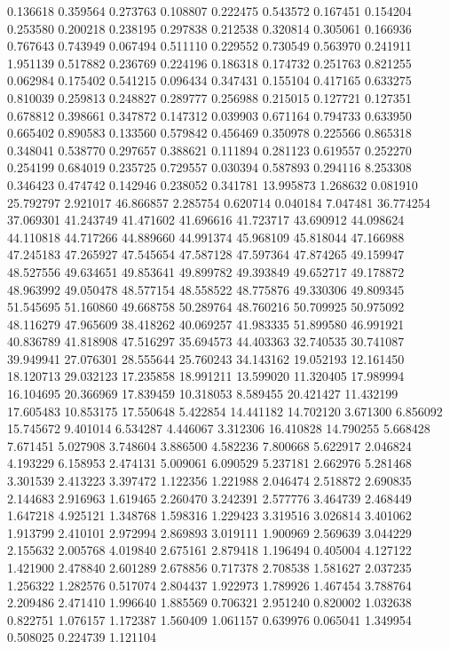 0.136618
0.359564
0.273763
0.108807
0.222475
0.543572
0.167451
0.154204
0.253580
0.200218
0.238195
0.297838
0.212538
0.320814
0.305061
0.166936
0.767643
0.743949
0.067494
0.511110
0.229552
0.730549
0.563970
0.241911
1.951139
0.517882
0.236769
0.224196
0.186318
0.174732
0.251763
0.821255
0.062984
0.175402
0.541215
0.096434
0.347431
0.155104
0.417165
0.633275
0.810039
0.259813
0.248827
0.289777
0.256988
0.215015
0.127721
0.127351
0.678812
0.398661
0.347872
0.147312
0.039903
0.671164
0.794733
0.633950
0.665402
0.890583
0.133560
0.579842
0.456469
0.350978
0.225566
0.865318
0.348041
0.538770
0.297657
0.388621
0.111894
0.281123
0.619557
0.252270
0.254199
0.684019
0.235725
0.729557
0.030394
0.587893
0.294116
8.253308
0.346423
0.474742
0.142946
0.238052
0.341781
13.995873
1.268632
0.081910
25.792797
2.921017
46.866857
2.285754
0.620714
0.040184
7.047481
36.774254
37.069301
41.243749
41.471602
41.696616
41.723717
43.690912
44.098624
44.110818
44.717266
44.889660
44.991374
45.968109
45.818044
47.166988
47.245183
47.265927
47.545654
47.587128
47.597364
47.874265
49.159947
48.527556
49.634651
49.853641
49.899782
49.393849
49.652717
49.178872
48.963992
49.050478
48.577154
48.558522
48.775876
49.330306
49.809345
51.545695
51.160860
49.668758
50.289764
48.760216
50.709925
50.975092
48.116279
47.965609
38.418262
40.069257
41.983335
51.899580
46.991921
40.836789
41.818908
47.516297
35.694573
44.403363
32.740535
30.741087
39.949941
27.076301
28.555644
25.760243
34.143162
19.052193
12.161450
18.120713
29.032123
17.235858
18.991211
13.599020
11.320405
17.989994
16.104695
20.366969
17.839459
10.318053
8.589455
20.421427
11.432199
17.605483
10.853175
17.550648
5.422854
14.441182
14.702120
3.671300
6.856092
15.745672
9.401014
6.534287
4.446067
3.312306
16.410828
14.790255
5.668428
7.671451
5.027908
3.748604
3.886500
4.582236
7.800668
5.622917
2.046824
4.193229
6.158953
2.474131
5.009061
6.090529
5.237181
2.662976
5.281468
3.301539
2.413223
3.397472
1.122356
1.221988
2.046474
2.518872
2.690835
2.144683
2.916963
1.619465
2.260470
3.242391
2.577776
3.464739
2.468449
1.647218
4.925121
1.348768
1.598316
1.229423
3.319516
3.026814
3.401062
1.913799
2.410101
2.972994
2.869893
3.019111
1.900969
2.569639
3.044229
2.155632
2.005768
4.019840
2.675161
2.879418
1.196494
0.405004
4.127122
1.421900
2.478840
2.601289
2.678856
0.717378
2.708538
1.581627
2.037235
1.256322
1.282576
0.517074
2.804437
1.922973
1.789926
1.467454
3.788764
2.209486
2.471410
1.996640
1.885569
0.706321
2.951240
0.820002
1.032638
0.822751
1.076157
1.172387
1.560409
1.061157
0.639976
0.065041
1.349954
0.508025
0.224739
1.121104
